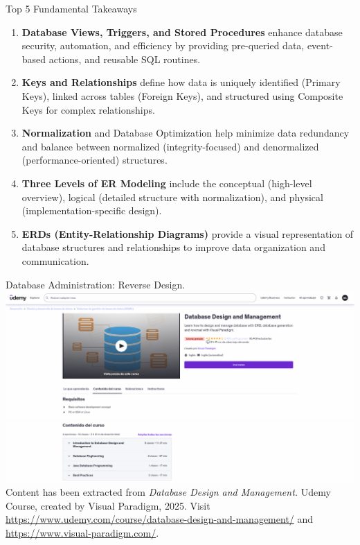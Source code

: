 \documentclass{beamer}
\begin{document}
\begin{frame}{Top 5 Fundamental Takeaways}
    \small
    \begin{enumerate} \pause
        \item[5] \textbf{Database Views, Triggers, and Stored Procedures} enhance database security, automation, and efficiency by providing pre-queried data, event-based actions, and reusable SQL routines. \pause

        \item[4] \textbf{Keys and Relationships} define how data is uniquely identified (Primary Keys), linked across tables (Foreign Keys), and structured using Composite Keys for complex relationships. \pause

        \item[3] \textbf{Normalization} and Database Optimization help minimize data redundancy and balance between normalized (integrity-focused) and denormalized (performance-oriented) structures. \pause

        \item[2] \textbf{Three Levels of ER Modeling} include the conceptual (high-level overview), logical (detailed structure with normalization), and physical (implementation-specific design). \pause

        \item[1] \textbf{ERDs (Entity-Relationship Diagrams)} provide a visual representation of database structures and relationships to improve data organization and communication. \pause
        \end{enumerate}
\end{frame}


\begin{frame}{Database Administration: Reverse Design.}
    \centering
    \includegraphics[width=\textwidth]{figures/udemy2}\\
    \includegraphics[width=\textwidth]{figures/udemy3}\\
    \vspace{2mm}
    {
        \scriptsize
        Content has been extracted from \textit{Database Design and Management.} Udemy Course, created by Visual Paradigm, 2025.  Visit \url{https://www.udemy.com/course/database-design-and-management/} and \url{https://www.visual-paradigm.com/}.\\
    }
\end{frame}
\end{document}
